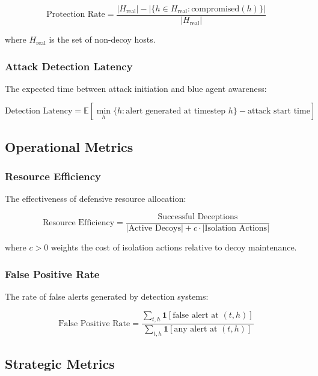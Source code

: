 \documentclass[11pt]{article}
\theoremstyle{definition}
\theoremstyle{plain}
\newcommand{\EE}{\mathbb{E}}
\begin{document}
\begin{equation}
\text{Protection Rate} = \frac{|H_{\text{real}}| - |\{h \in H_{\text{real}} : \text{compromised}(h)\}|}{|H_{\text{real}}|}
\end{equation}

where $H_{\text{real}}$ is the set of non-decoy hosts.

\subsubsection{Attack Detection Latency}
The expected time between attack initiation and blue agent awareness:

\begin{equation}
\text{Detection Latency} = \EE\left[\min_h \{h : \text{alert generated at timestep } h\} - \text{attack start time}\right]
\end{equation}

\subsection{Operational Metrics}

\subsubsection{Resource Efficiency}
The effectiveness of defensive resource allocation:

\begin{equation}
\text{Resource Efficiency} = \frac{\text{Successful Deceptions}}{|\text{Active Decoys}| + c \cdot |\text{Isolation Actions}|}
\end{equation}

where $c > 0$ weights the cost of isolation actions relative to decoy maintenance.

\subsubsection{False Positive Rate}
The rate of false alerts generated by detection systems:

\begin{equation}
\text{False Positive Rate} = \frac{\sum_{t,h} \mathbf{1}[\text{false alert at } (t,h)]}{\sum_{t,h} \mathbf{1}[\text{any alert at } (t,h)]}
\end{equation}

\subsection{Strategic Metrics}
\end{document}
